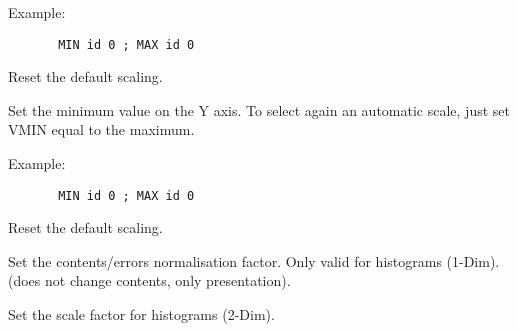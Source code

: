    \par
Example:  
\begin{verbatim}
       MIN id 0 ; MAX id 0
\end{verbatim}
   \par
Reset the default scaling.  

\ENDCMD


\BEGARG
{}
\ENDARG

   \par
Set the minimum value on the Y axis.  To select again an automatic scale, 
   just set VMIN equal to the maximum.  

   \par
Example:  
\begin{verbatim}
       MIN id 0 ; MAX id 0
\end{verbatim}
   \par
Reset the default scaling.  

\ENDCMD


\BEGARG
{}
\ENDARG

   \par
Set the contents/errors normalisation factor.  Only valid for histograms 
   (1-Dim).  (does not change contents, only presentation).  

\ENDCMD


\BEGARG
{}
\ENDARG

   \par
Set the scale factor for histograms (2-Dim).  

\ENDCMD


